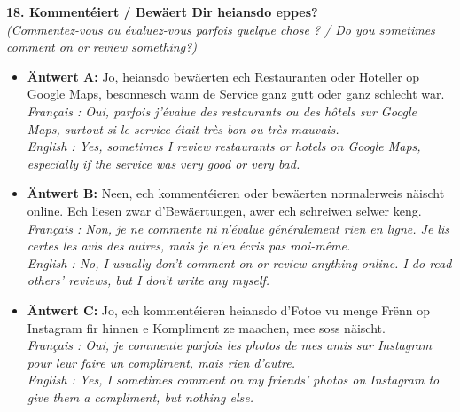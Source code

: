 \noindent\textbf{18. Kommentéiert / Bewäert Dir heiansdo eppes?}\\
\textit{(Commentez-vous ou évaluez-vous parfois quelque chose ? / Do you sometimes comment on or review something?)}
\begin{itemize}
    \item \textbf{Äntwert A:} Jo, heiansdo bewäerten ech Restauranten oder Hoteller op Google Maps, besonnesch wann de Service ganz gutt oder ganz schlecht war.\\
    \textit{Français : Oui, parfois j'évalue des restaurants ou des hôtels sur Google Maps, surtout si le service était très bon ou très mauvais.}\\
    \textit{English : Yes, sometimes I review restaurants or hotels on Google Maps, especially if the service was very good or very bad.}
    \item \textbf{Äntwert B:} Neen, ech kommentéieren oder bewäerten normalerweis näischt online. Ech liesen zwar d'Bewäertungen, awer ech schreiwen selwer keng.\\
    \textit{Français : Non, je ne commente ni n'évalue généralement rien en ligne. Je lis certes les avis des autres, mais je n'en écris pas moi-même.}\\
    \textit{English : No, I usually don't comment on or review anything online. I do read others' reviews, but I don't write any myself.}
    \item \textbf{Äntwert C:} Jo, ech kommentéieren heiansdo d'Fotoe vu menge Frënn op Instagram fir hinnen e Kompliment ze maachen, mee soss näischt.\\
    \textit{Français : Oui, je commente parfois les photos de mes amis sur Instagram pour leur faire un compliment, mais rien d'autre.}\\
    \textit{English : Yes, I sometimes comment on my friends' photos on Instagram to give them a compliment, but nothing else.}
\end{itemize}
\vspace{0.5em}

